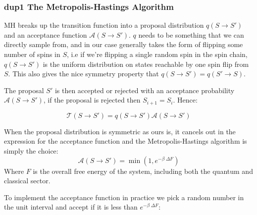 \hypertarget{dup1-the-metropolis-hastings-algorithm}{%
\subsubsection{dup1 The Metropolis-Hastings Algorithm}\label{dup1-the-metropolis-hastings-algorithm}}

MH breaks up the transition function into a proposal distribution \(q(S \to S')\) and an acceptance function \(\mathcal{A}(S \to S')\). \(q\) needs to be something that we can directly sample from, and in our case generally takes the form of flipping some number of spins in \(S\), i.e if we're flipping a single random spin in the spin chain, \(q(S \to S')\) is the uniform distribution on states reachable by one spin flip from \(S\). This also gives the nice symmetry property that \(q(S \to S') = q(S' \to S)\).

The proposal \(S'\) is then accepted or rejected with an acceptance probability \(\mathcal{A}(S \to S')\), if the proposal is rejected then \(S_{i+1} = S_{i}\). Hence:

\[\mathcal{T}(S\to S') = q(S\to S')\mathcal{A}(S \to S')\]

When the proposal distribution is symmetric as ours is, it cancels out in the expression for the acceptance function and the Metropolis-Hastings algorithm is simply the choice: \[ \mathcal{A}(S \to S') = \min\left(1, e^{-\beta\;\Delta F}\right)\] Where \(F\) is the overall free energy of the system, including both the quantum and classical sector.

To implement the acceptance function in practice we pick a random number in the unit interval and accept if it is less than \(e^{-\beta\;\Delta F}\):

\begin{Shaded}
\begin{Highlighting}[]
\OperatorTok{=}

 
\OperatorTok{=}
\OperatorTok{=}

    \NormalTok{,}\NormalTok{) }\OperatorTok{\textless{}}\OperatorTok{{-}}\OperatorTok{*}
\OperatorTok{=}
        
\OperatorTok{=}
\end{Highlighting}
\end{Shaded}

